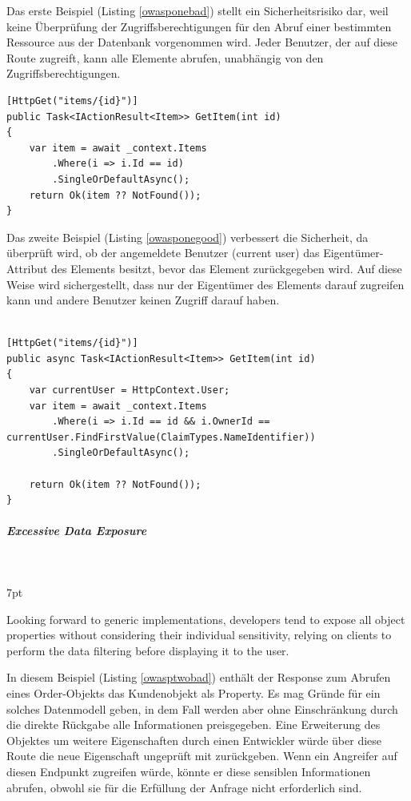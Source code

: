 \documentclass[notitlepage, hidelinks]{article}
\newenvironment{formal}{%
  \def\FrameCommand{%
    \hspace{1pt}%
    {\color{black}\vrule width 2pt}%
    {\color{formalshade}\vrule width 4pt}%
    \colorbox{formalshade}%
  }%
  \MakeFramed{\advance\hsize-\width\FrameRestore}%
  \noindent\hspace{-4.55pt}%
  \begin{adjustwidth}{}{7pt}%
  \vspace{2pt}\vspace{2pt}%
}
{%
  \vspace{2pt}\end{adjustwidth}\endMakeFramed%
}
\begin{document}
Das erste Beispiel (Listing \ref{owasponebad}) stellt ein Sicherheitsrisiko dar, weil keine Überprüfung der Zugriffsberechtigungen für den Abruf einer bestimmten Ressource aus der Datenbank vorgenommen wird. Jeder Benutzer, der auf diese Route zugreift, kann alle Elemente abrufen, unabhängig von den Zugriffsberechtigungen.

\begin{lstlisting}[language={[Sharp]C},frame=single,caption=Negativbeispiel Broken Object Level Authorization,label=owasponebad]
[HttpGet("items/{id}")] 
public Task<IActionResult<Item>> GetItem(int id) 
{ 
	var item = await _context.Items
        .Where(i => i.Id == id)
        .SingleOrDefaultAsync();
    return Ok(item ?? NotFound());
}
\end{lstlisting}

Das zweite Beispiel (Listing \ref{owasponegood}) verbessert die Sicherheit, da überprüft wird, ob der angemeldete Benutzer (current user) das Eigentümer-Attribut des Elements besitzt, bevor das Element zurückgegeben wird. Auf diese Weise wird sichergestellt, dass nur der Eigentümer des Elements darauf zugreifen kann und andere Benutzer keinen Zugriff darauf haben.

\begin{lstlisting}[language={[Sharp]C},frame=single,caption=Positivbeispiel Broken Object Level Authorization,label=owasponegood]

[HttpGet("items/{id}")]
public async Task<IActionResult<Item>> GetItem(int id)
{
    var currentUser = HttpContext.User;
    var item = await _context.Items
        .Where(i => i.Id == id && i.OwnerId == currentUser.FindFirstValue(ClaimTypes.NameIdentifier))
        .SingleOrDefaultAsync();

    return Ok(item ?? NotFound());
}
\end{lstlisting}


\subparagraph{Excessive Data Exposure} \mbox{} \\
\begin{formal}
Looking forward to generic implementations, developers tend to expose all object properties without considering their individual sensitivity, relying on clients to perform the data filtering before displaying it to the user.
\end{formal}
In diesem Beispiel (Listing \ref{owasptwobad}) enthält der Response zum Abrufen eines Order-Objekts das Kundenobjekt als Property. Es mag Gründe für ein solches Datenmodell geben, in dem Fall werden aber ohne Einschränkung durch die direkte Rückgabe alle Informationen preisgegeben. Eine Erweiterung des Objektes  um weitere Eigenschaften durch einen Entwickler würde über diese Route die neue Eigenschaft ungeprüft mit zurückgeben. Wenn ein Angreifer auf diesen Endpunkt zugreifen würde, könnte er diese sensiblen Informationen abrufen, obwohl sie für die Erfüllung der Anfrage nicht erforderlich sind.
\end{document}
